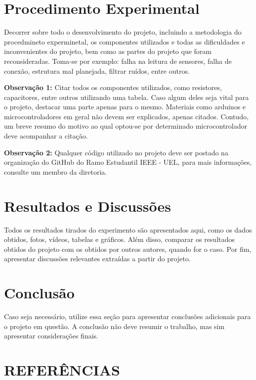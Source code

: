 \documentclass[a4paper,12pt]{article}
\begin{document}
\newpage
\section{Procedimento Experimental}
\label{sec:procedimento_experimental}
Decorrer sobre todo o desenvolvimento do projeto, incluindo a metodologia do procedmineto experminetal, os componentes utilizados e todas as dificuldades e inconvenientes do projeto, bem como as partes do projeto que foram reconsideradas. Toma-se por exemplo: falha na leitura de sensores, falha de conexão, estrutura mal planejada, filtrar ruídos, entre outros.

\textbf{Observação 1: } Citar todos os componentes utilizados, como resistores, capacitores, entre outros utilizando uma tabela. Caso algum deles seja vital para o projeto, destacar uma parte apenas para o mesmo. Materiais como arduinos e microcontroladores em geral não devem ser explicados, apenas citados. Contudo, um breve resumo do motivo ao qual optou-se por determinado microcontrolador deve acompanhar a citação.

\textbf{Observação 2: }Qualquer código utilizado no projeto deve ser postado na organização do GitHub do Ramo Estudantil IEEE - UEL, para mais informações, consulte um membro da diretoria.

\newpage
\section{Resultados e Discussões}
\label{sec:resultados}
Todos  os  resultados  tirados  do  experimento  são  apresentados  aqui,  como os dados obtidos, fotos, vídeos, tabelas e gráficos. Além disso, comparar os resultados obtidos do projeto com os obtidos por outros autores, quando for o caso. Por fim, apresentar discussões relevantes extraídas a partir do projeto.

\newpage
\section{Conclusão}
\label{sec:conclusao}
Caso seja necessário, utilize essa seção para apresentar conclusões adicionais para o projeto em questão. A conclusão não deve resumir o trabalho, mas sim apresentar considerações finais. 

\newpage
\section{REFERÊNCIAS}
\begingroup
\renewcommand{\section}[2]{}
\end{document}

